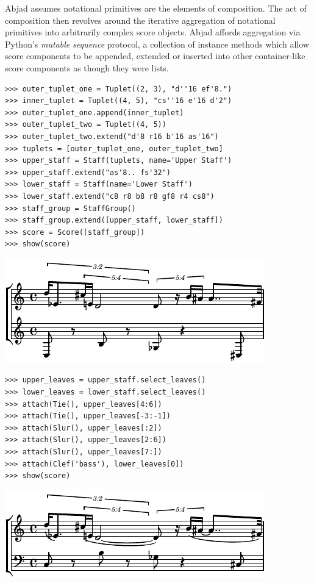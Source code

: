 \documentclass{article}
\begin{document}
\hrulefill\vspace{5pt}

Abjad assumes notational primitives are the elements of composition. The act of
composition then revolves around the iterative aggregation of notational
primitives into arbitrarily complex score objects. Abjad affords aggregation
via Python's \emph{mutable sequence} protocol, a collection of instance methods
which allow score components to be appended, extended or inserted into other
container-like score components as though they were lists.

\begin{lstlisting}
>>> outer_tuplet_one = Tuplet((2, 3), "d''16 ef'8.")
>>> inner_tuplet = Tuplet((4, 5), "cs''16 e'16 d'2")
>>> outer_tuplet_one.append(inner_tuplet)
>>> outer_tuplet_two = Tuplet((4, 5))
>>> outer_tuplet_two.extend("d'8 r16 b'16 as'16")
>>> tuplets = [outer_tuplet_one, outer_tuplet_two]
>>> upper_staff = Staff(tuplets, name='Upper Staff')
>>> upper_staff.extend("as'8.. fs'32")
>>> lower_staff = Staff(name='Lower Staff')
>>> lower_staff.extend("c8 r8 b8 r8 gf8 r4 cs8")
>>> staff_group = StaffGroup()
>>> staff_group.extend([upper_staff, lower_staff])
>>> score = Score([staff_group])
>>> show(score)
\end{lstlisting}

\includegraphics[scale=1.0]{images/abjad-1.pdf}


\begin{lstlisting}
>>> upper_leaves = upper_staff.select_leaves()
>>> lower_leaves = lower_staff.select_leaves()
>>> attach(Tie(), upper_leaves[4:6])
>>> attach(Tie(), upper_leaves[-3:-1])
>>> attach(Slur(), upper_leaves[:2])
>>> attach(Slur(), upper_leaves[2:6])
>>> attach(Slur(), upper_leaves[7:])
>>> attach(Clef('bass'), lower_leaves[0])
>>> show(score)
\end{lstlisting}

\includegraphics[scale=1.0]{images/abjad-2.pdf}
\end{document}
